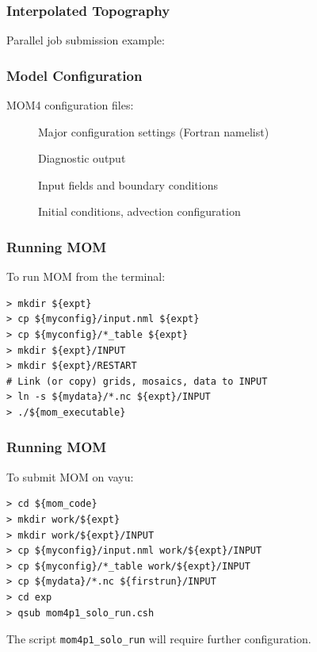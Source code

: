 \documentclass{beamer}
\begin{document}
\begin{frame}
    \frametitle{Interpolated Topography}
    
    Parallel job submission example:
    
\end{frame}

\begin{frame}
    \frametitle{Model Configuration}
    
    MOM4 configuration files:
    \begin{description}
        \item[] Major configuration settings (Fortran
            namelist)
        \item[] Diagnostic output
        \item[] Input fields and boundary conditions
        \item[] Initial conditions, advection
            configuration
    \end{description}
\end{frame}

\begin{frame}[fragile]
    \frametitle{Running MOM}
    
    To run MOM from the terminal:
    \begin{lstlisting}
> mkdir ${expt}
> cp ${myconfig}/input.nml ${expt}
> cp ${myconfig}/*_table ${expt}
> mkdir ${expt}/INPUT
> mkdir ${expt}/RESTART
# Link (or copy) grids, mosaics, data to INPUT
> ln -s ${mydata}/*.nc ${expt}/INPUT
> ./${mom_executable}
    \end{lstlisting}

\end{frame}

\begin{frame}[fragile]
    \frametitle{Running MOM}
    
    To submit MOM on vayu:
    \begin{lstlisting}
> cd ${mom_code}
> mkdir work/${expt}
> mkdir work/${expt}/INPUT
> cp ${myconfig}/input.nml work/${expt}/INPUT
> cp ${myconfig}/*_table work/${expt}/INPUT
> cp ${mydata}/*.nc ${firstrun}/INPUT
> cd exp
> qsub mom4p1_solo_run.csh
    \end{lstlisting}
The script \lstinline|mom4p1_solo_run| will require further configuration.

\end{frame}
\end{document}
